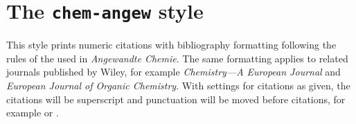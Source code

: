 \documentclass[a4paper]{article}
\begin{document}
\section*{The \texttt{chem-angew} style}

This style prints numeric citations with bibliography
formatting following the rules of the used in \emph{Angewandte
Chemie}. The same formatting applies to related journals
published by Wiley, for example \emph{Chemistry---A European
Journal} and \emph{European Journal of Organic Chemistry}. With
settings for citations as given, the citations will be
superscript and punctuation will be moved before citations, for
example \autocite{Kabbe1973} or \autocite{Arduengo1991}.

\nocite{*}

\printbibliography
\end{document}
